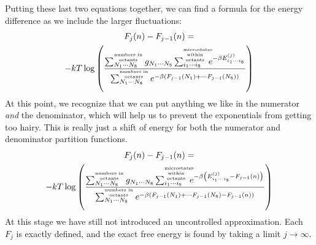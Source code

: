 \documentclass[letterpaper,twocolumn,amsmath,amssymb,pre,aps,10pt]{revtex4-1}
\newcommand{\fixme}[1]{{\bf\color{red}{[#1]}}}
\begin{document}
Putting these last two equations together, we can find a formula for
the energy difference as we include the larger fluctuations:
\begin{multline}
  F_j(n) - F_{j-1}(n) =\\
  -kT\log\left(\frac{
    \sumoccupanciesofoctants
       g_{N_1\cdots N_8}
       \summicrostatesofoctants
       e^{-\beta E_{i_1\cdots i_8}^{(j)}}
  }{
    \sumoccupanciesofoctants
        e^{-\beta \left( F_{j-1}(N_1) + \cdots F_{j-1}(N_8) \right)}
  }
  \right)
\end{multline}
At this point, we recognize that we can put anything we like in the
numerator \emph{and} the denominator, which will help us to prevent
the exponentials from getting too hairy.  This is really just a shift
of energy for both the numerator and denominator partition functions.
\begin{multline}
  F_j(n) - F_{j-1}(n) =\\
  -kT\log\left(\frac{
    \sumoccupanciesofoctants
       g_{N_1\cdots N_8}
       \summicrostatesofoctants
       e^{-\beta \left(E_{i_1\cdots i_8}^{(j)}  - F_{j-1}(n) \right)}
  }{
    \sumoccupanciesofoctants
       e^{-\beta \left( F_{j-1}(N_1) + \cdots F_{j-1}(N_8)  - F_{j-1}(n) \right)}
  }
  \right)
\end{multline}
At this stage we have still not introduced an uncontrolled
approximation.  Each $F_{j}$ is exactly defined, and the exact free
energy is found by taking a limit $j\rightarrow \infty$.  \fixme{I
  need to clarify the scale of each $F$.  Some of the above are about
  systems $\frac18$ the volume of others.}
\end{document}
